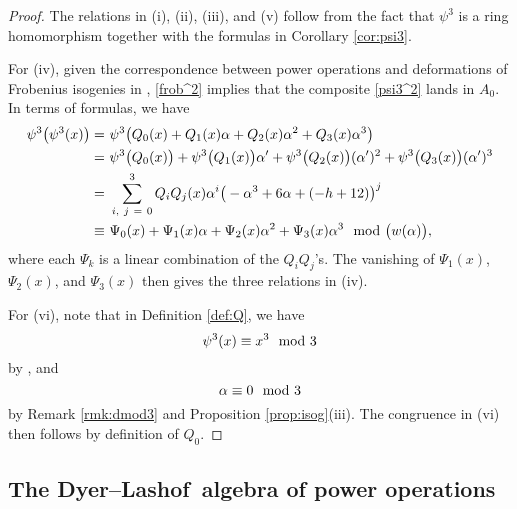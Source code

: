 \documentclass{gtpart}
\theoremstyle{definition}
\theoremstyle{remark}
\newcommand{\DL}{Dyer--Lashof~}
\newcommand{\md}{~~{\rm mod}~}
\newcommand{\A}{\alpha}
\newcommand{\p}{\psi^3}
\begin{document}
\begin{proof}
 The relations in (i), (ii), (iii), and (v) follow from the fact that $\p$ is a ring homomorphism together with the formulas in Corollary \ref{cor:psi3}.  

 For (iv), given the correspondence between power operations and deformations of Frobenius isogenies in \cite[Theorem B]{cong}, 
 \eqref{frob^2} implies that the composite \eqref{psi3^2} lands in $A_0$.  In terms of formulas, we have 
 \begin{equation*}
 \begin{split}
  \p \big( \p(x) \big) = & ~ \p \big( Q_0(x) + Q_1(x) \A + Q_2(x) \A^2 + Q_3(x) \A^3 \big) \\
                       = & ~ \p \big( Q_0(x) \big) + \p \big( Q_1(x) \big) \A' + \p \big( Q_2(x) \big) (\A')^2 + \p \big( Q_3(x) \big) (\A')^3 \\
                       = & ~ \sum_{i,~j~=~0}^3 Q_iQ_j(x) \A^i \big( -\A^3 + 6 \A + (-h + 12) \big)^j \\
                  \equiv & ~ \Psi_0(x) + \Psi_1(x) \A + \Psi_2(x) \A^2 + \Psi_3(x) \A^3 \md \big( w(\A) \big), 
 \end{split}
 \end{equation*}
 where each $\Psi_k$ is a linear combination of the $Q_iQ_j$'s.  
 The vanishing of $\Psi_1(x)$, $\Psi_2(x)$, and $\Psi_3(x)$ then gives the three relations in (iv).  

 For (vi), note that in Definition \ref{def:Q}, we have 
 \[
  \p(x) \equiv x^3 \md 3 
 \]
 by \cite[Propositions 3.25 and 10.5]{cong}, and 
 \[
  \A \equiv 0 \md 3 
 \]
 by Remark \ref{rmk:dmod3} and Proposition \ref{prop:isog}\thinspace (iii).  
 The congruence in (vi) then follows by definition of $Q_0$.  
\end{proof}


\subsection{The \DL algebra of power operations}
\end{document}
